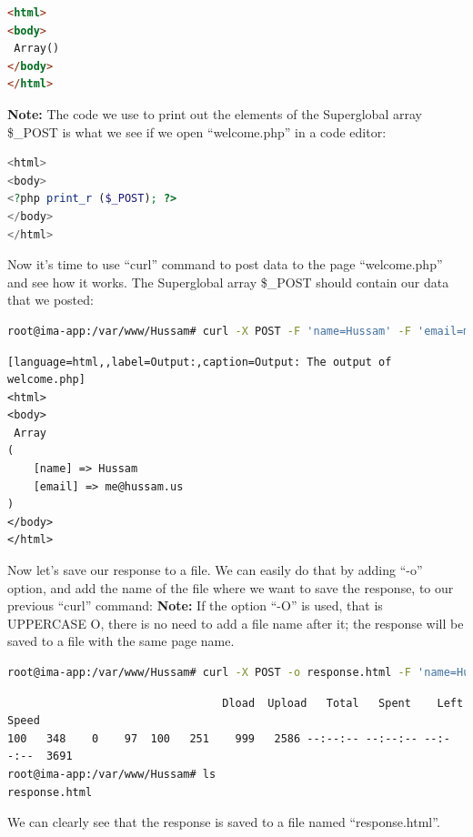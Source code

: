 \documentclass[a4paper, 11pt]{article}
\begin{document}
\begin{lstlisting}[language=html,label=Output:,caption=Output: The output of welcome.php]     
<html>
<body>
 Array()
</body>
</html>
\end{lstlisting}

\textbf{Note:}
The code we use to print out the elements of the Superglobal array \$\_POST is what we see if we open ``welcome.php'' in a code editor:

\begin{lstlisting}[language=php,label=welcome.php,caption=The content of welcome.php]
<html>
<body>
<?php print_r ($_POST); ?>
</body>
</html>
\end{lstlisting}

Now it's time to use ``curl'' command to post data to the page ``welcome.php'' and see how it works. The Superglobal array \$\_POST should contain our data that we posted:

\begin{lstlisting}[language=bash,label=Command:,caption=Command:] 
root@ima-app:/var/www/Hussam# curl -X POST -F 'name=Hussam' -F 'email=me@hussam.us' http://www.cs.odu.edu/~hhallak/532/A1/Q1/welcome.php
\end{lstlisting}
\begin{lstlisting}[language=html,,label=Output:,caption=Output: The output of welcome.php]
<html>
<body>
 Array
(
    [name] => Hussam
    [email] => me@hussam.us
)
</body>
</html> 
\end{lstlisting}

Now let's save our response to a file. We can easily do that by adding ``-o'' option, and add the name of the file where we want to save the response, to our previous ``curl'' command:
\textbf{Note:}
If the option ``-O'' is used, that is UPPERCASE O, there is no need to add a file name after it; the response will be saved to a file with the same page name.

\begin{lstlisting}[language=bash,label=Command:,caption=Command:]
root@ima-app:/var/www/Hussam# curl -X POST -o response.html -F 'name=Hussam' -F 'email=me@hussam.us' http://www.cs.odu.edu/~hhallak/532/A1/Q1/welcome.php
\end{lstlisting}
\begin{lstlisting}[label=Output:,caption=Output:]
  % Total    % Received % Xferd  Average Speed   Time    Time     Time  Current
                                 Dload  Upload   Total   Spent    Left  Speed
100   348    0    97  100   251    999   2586 --:--:-- --:--:-- --:--:--  3691
root@ima-app:/var/www/Hussam# ls
response.html
\end{lstlisting}
We can clearly see that the response is saved to a file named ``response.html''.
\end{document}
